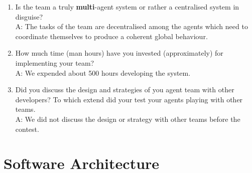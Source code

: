 \begin{enumerate}
	\item  Is the team a truly \textbf{multi}-agent system or rather a centralised system in disguise?\\
	A: The tasks of the team are decentralised among the agents which need to coordinate themselves to produce a coherent global behaviour.%
	
	
	\item  How much time (man hours) have you invested (approximately) for implementing your team?\\
	 A: We expended about 500 hours developing the system.%


	\item  Did you discuss the design and strategies of you agent team with other developers? To which extend did your test your agents playing with other teams.\\
	A: We did not discuss the design or strategy with other teams before the contest.%
	
\end{enumerate}

\section{Software Architecture}

